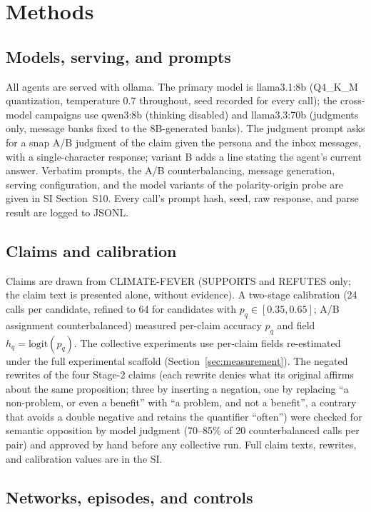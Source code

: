 \documentclass[9pt,twocolumn]{extarticle}
\begin{document}
\section*{Methods}

\subsection*{Models, serving, and prompts}

All agents are served with ollama. The primary model is llama3.1:8b
(Q4\_K\_M quantization, temperature 0.7 throughout, seed recorded for every
call); the cross-model campaigns use qwen3:8b (thinking disabled) and
llama3.3:70b (judgments only, message banks fixed to the 8B-generated banks).
The judgment prompt asks for a snap A/B judgment of the claim given the
persona and the inbox messages, with a single-character response; variant B
adds a line stating the agent's current answer. Verbatim prompts, the A/B
counterbalancing, message generation, serving configuration, and the model
variants of the polarity-origin probe are given in SI Section~S10. Every
call's prompt hash, seed, raw response, and parse result are logged to JSONL.

\subsection*{Claims and calibration}

Claims are drawn from CLIMATE-FEVER \citep{Diggelmann2020} (SUPPORTS and
REFUTES only; the claim text is presented alone, without evidence). A
two-stage calibration (24 calls per candidate, refined to 64 for candidates
with $p_q \in [0.35, 0.65]$; A/B assignment counterbalanced) measured
per-claim accuracy $p_q$ and field $h_q = \mathrm{logit}(p_q)$. The collective
experiments use per-claim fields re-estimated under the full experimental
scaffold (Section~\ref{sec:measurement}). The negated rewrites of the four
Stage-2 claims (each rewrite denies what its original affirms about the
same proposition; three by inserting a negation, one by replacing ``a non-problem, or even a
benefit'' with ``a problem, and not a benefit'', a contrary that avoids a
double negative and retains the quantifier ``often'') were checked for
semantic opposition by model judgment
(70--85\% of 20 counterbalanced calls per pair) and approved by hand before
any collective run. Full claim texts, rewrites, and calibration values are in
the SI.

\subsection*{Networks, episodes, and controls}
\end{document}
